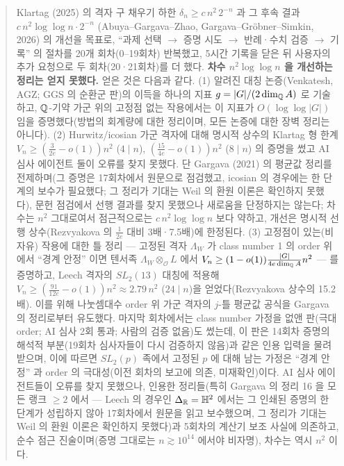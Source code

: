 \begin{abstract}
\noindent Klartag (2025) 의 격자 구 채우기 하한 $\delta_n\ge c\,n^2\,2^{-n}$ 과 그 후속 결과 $c\,n^2\log\log n\cdot 2^{-n}$ (Abuya--Gargava--Zhao, Gargava--Gr\"obner--Simkin, 2026) 의 개선을 목표로, ``과제 선택 $\to$ 증명 시도 $\to$ 반례·수치 검증 $\to$ 기록'' 의 절차를 20개 회차(0--19회차) 반복했고, 5시간 기록을 닫은 뒤 사용자의 추가 요청으로 두 회차(20·21회차)를 더 했다. \textbf{차수 $n^2\log\log n$ 을 개선하는 정리는 얻지 못했다.} 얻은 것은 다음과 같다.
(1) 알려진 대칭 논증(Venkatesh, AGZ; GGS 의 순환군 판)의 이득을 하나의 지표 $g=|G|/(2\dim_\Q A)$ 로 기술하고, $\Q$-기약 가군 위의 고정점 없는 작용에서는 이 지표가 $O(\log\log|G|)$ 임을 증명했다(방법의 회계량에 대한 정리이며, 모든 논증에 대한 장벽 정리는 아니다).
(2) Hurwitz/icosian 가군 격자에 대해 명시적 상수의 Klartag 형 한계 $V_n\ge(\tfrac{3}{2e}-o(1))n^2$ ($4\mid n$), $(\tfrac{15}{4e}-o(1))n^2$ ($8\mid n$) 의 증명을 썼고 AI 심사 에이전트 둘이 오류를 찾지 못했다. 단 Gargava (2021) 의 평균값 정리를 전제하며(그 증명은 17회차에서 원문으로 점검했고, icosian 의 경우에는 한 단계의 보수가 필요했다; 그 정리가 기대는 Weil 의 환원 이론은 확인하지 못했다), 문헌 점검에서 선행 결과를 찾지 못했으나 새로움을 단정하지는 않는다; 차수는 $n^2$ 그대로여서 점근적으로는 $c\,n^2\log\log n$ 보다 약하고, 개선은 명시적 선행 상수(Rezvyakova 의 $\tfrac1{2e}$ 대비 3배·7.5배)에 한정된다.
(3) 고정점이 있는(비자유) 작용에 대한 틀 정리 --- 고정된 격자 $\Lambda_W$ 가 class number 1 의 order 위에서 ``경계 안정'' 이면 텐서족 $\Lambda_W\otimes_{\mathcal O}L$ 에서 $V_n\ge(1-o(1))\tfrac{|G|}{4e\dim_\Q A}n^2$ --- 를 증명하고, Leech 격자의 $SL_2(13)$ 대칭에 적용해 $V_n\ge(\tfrac{91}{12e}-o(1))n^2\approx2.79\,n^2$ ($24\mid n$)을 얻었다(Rezvyakova 상수의 15.2배). 이를 위해 나눗셈대수 order 위 가군 격자의 $j$-틀 평균값 공식을 Gargava 의 정리로부터 유도했다. 마지막 회차에서는 class number 가정을 없앤 판(극대 order; AI 심사 2회 통과; 사람의 검증 없음)도 썼는데, 이 판은 14회차 증명의 해석적 부분(19회차 심사자들이 다시 검증하지 않음)과 같은 인용 입력을 물려받으며, 이에 따르면 $SL_2(p)$ 족에서 고정된 $p$ 에 대해 남는 가정은 ``경계 안정'' 과 order 의 극대성(이전 회차의 보고에 의존, 미재확인)이다. AI 심사 에이전트들이 오류를 찾지 못했으나, 인용한 정리들(특히 Gargava 의 정리 16 을 모든 랭크 $\ge2$ 에서 --- Leech 의 경우인 $\Delta_\R=\HH^2$ 에서는 그 인쇄된 증명의 한 단계가 성립하지 않아 17회차에서 원문을 읽고 보수했으며, 그 정리가 기대는 Weil 의 환원 이론은 확인하지 못했다)과 5회차의 계산기 보조 사실에 의존하고, 순수 점근 진술이며(증명 그대로는 $n\gtrsim10^{14}$ 에서야 비자명), 차수는 역시 $n^2$ 이다.

\end{abstract}

